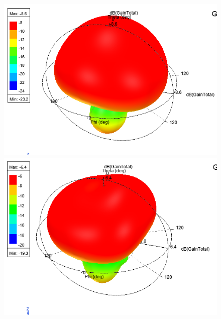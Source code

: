 \documentclass[10pt, a4paper]{article}%
\begin{document}
	\begin{figure}[ht!]
		\centering
		\begin{minipage}{0.32\textwidth}
			\centering
			\includegraphics[width = 1\textwidth]{GAIN_model.png}
		\end{minipage}%
		\hfill
		\begin{minipage}{0.32\textwidth}
			\centering
			\includegraphics[width= 1\textwidth]{GAIN_model_long.png}
		\end{minipage}
		\hfill
		\begin{minipage}{0.32\textwidth}
			\centering

\end{minipage}
\end{figure}
\end{document}
